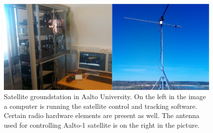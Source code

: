 \documentclass[english,12pt,a4paper,pdftex,elec,utf8]{aaltothesis}
\begin{document}
\begin{figure}[!h]
\centering
\includegraphics[scale=0.2]{groundstation}
\caption{Satellite groundstation in Aalto University. On the left in the image a computer is running the satellite control and tracking software. Certain radio hardware elements are present as well. The antenna used for controlling Aalto-1 satellite is on the right in the picture.}
\label{aaltogs}
\end{figure}  
    
\end{document}
